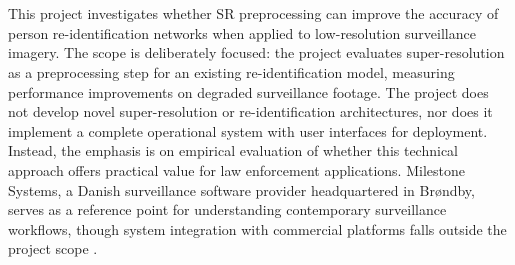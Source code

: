 \\\\
This project investigates whether \ac{SR} preprocessing can improve the accuracy of person re-identification networks when applied to low-resolution surveillance imagery. The scope is deliberately focused: the project evaluates super-resolution as a preprocessing step for an existing re-identification model, measuring performance improvements on degraded surveillance footage. The project does not develop novel super-resolution or re-identification architectures, nor does it implement a complete operational system with user interfaces for deployment. Instead, the emphasis is on empirical evaluation of whether this technical approach offers practical value for law enforcement applications. Milestone Systems, a Danish surveillance software provider headquartered in Brøndby, serves as a reference point for understanding contemporary surveillance workflows, though system integration with commercial platforms falls outside the project scope \cite{MilestoneSystems2025}.
\\\\
